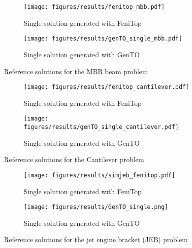 \begin{figure*}[ht!]
\centering
\begin{subfigure}[t]{0.4\textwidth}
    \centering
    \texttt{[image: figures/results/fenitop\_mbb.pdf]}
    \caption{Single solution generated with FeniTop}%
    \label{fig:fenitop_mbb}
\end{subfigure}
\begin{subfigure}[t]{0.4\textwidth}
    \centering
    \texttt{[image: figures/results/genTO\_single\_mbb.pdf]}
    \caption{Single solution generated with GenTO}%
    \label{fig:genTO_single_mbb}
\end{subfigure}

\caption{ Reference solutions for the MBB beam problem
}
\label{fig:mbb_reference}
\end{figure*}

\begin{figure*}[ht!]
\centering
\begin{subfigure}[t]{0.4\textwidth}
    \centering
    \texttt{[image: figures/results/fenitop\_cantilever.pdf]}
    \caption{Single solution generated with FeniTop}%
    \label{fig:fenitop_cantilever}
\end{subfigure}
\begin{subfigure}[t]{0.4\textwidth}
    \centering
    \texttt{[image: figures/results/genTO\_single\_cantilever.pdf]}
    \caption{Single solution generated with GenTO}%
    \label{fig:genTO_single_cantilever}
\end{subfigure}

\caption{Reference solutions for the Cantilever problem}
\label{fig:cantilever_reference}
\end{figure*}

\begin{figure*}[ht!]
\centering
\begin{subfigure}[t]{0.4\textwidth}
    \texttt{[image: figures/results/simjeb\_fenitop.pdf]}
    \caption{Single solution generated with FeniTop}
    \label{fig:simjeb_fenitop}   
\end{subfigure}
\begin{subfigure}[t]{0.4\textwidth}
    \texttt{[image: figures/results/GenTO\_single.png]}
    \caption{Single solution generated with GenTO}
    \label{fig:genTO_single_simjeb}   
\end{subfigure}
\caption{Reference solutions for the jet engine bracket (JEB) problem}
\label{fig:simjeb_reference}
\end{figure*}

